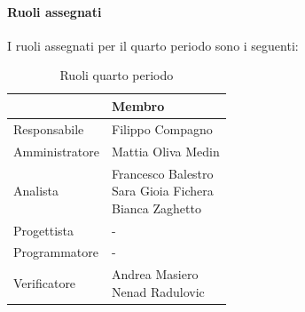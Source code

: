 \documentclass[a4paper,12pt]{article}
\begin{document}
            \paragraph{Ruoli assegnati}
            I ruoli assegnati per il quarto periodo sono i seguenti:
                \begin{table}[H]
                \centering
                \caption {Ruoli quarto periodo}
                \begin{tabular}{|l|l|}
                \hline
                    \rowcolor{lightgray}{\textbf{Ruolo}} & {\textbf{Membro}} \\
                \hline
                    Responsabile & Filippo Compagno \\
                \hline
                    Amministratore & Mattia Oliva Medin \\
                \hline
                    Analista & \makecell[l]{Francesco Balestro \\ Sara Gioia Fichera \\ Bianca Zaghetto} \\
                \hline
                    Progettista & - \\
                \hline
                    Programmatore & - \\
                \hline
                    Verificatore & \makecell[l]{Andrea Masiero \\ Nenad Radulovic} \\
                \hline
                \end{tabular}
                \end{table}
                
\end{document}
